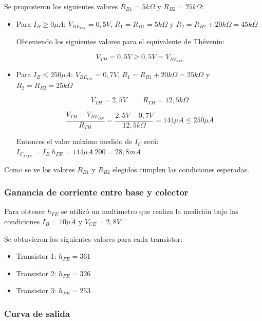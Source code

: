 \documentclass[10pt,spanish,a4paper,openany,notitlepage]{article}
\begin{document}
Se propusieron los siguientes valores $R_{B1} = 5\unit{k\Omega}$ y $R_{B2} = 25\unit{k\Omega}$:

\begin{itemize}
\item{Para $I_B \geq 0 \unit{\mu A}$}: $V_{BE_{ON}} = 0,5 \unit{V}$, $R_1 = R_{B1} = 5 \unit{k\Omega}$ y $R_2 = R_{B2} + 20\unit{k\Omega} = 45 \unit{k\Omega}$

Obteniendo los siguientes valores para el equivalente de Thévenin:

\[ \displaystyle V_{TH} =  0,5 \unit{V} \geq 0,5 \unit{V} = V_{BE_{ON}}\]

\item{Para $I_B \leq 250 \unit{\mu A}$}: $V_{BE_{ON}} = 0,7 \unit{V}$, $R_1 = R_{B1}+ 20\unit{k\Omega} = 25 \unit{k\Omega}$ y $R_2 = R_{B2} = 25 \unit{k\Omega}$

\[ \displaystyle V_{TH} =  2,5 \unit{V} \ \ \ \ \ \ \ \ \ \  R_{TH} = 12,5 \unit{k\Omega}\]

\[ \displaystyle \frac{V_{TH} - V_{BE_{ON}}}{R_{TH}} = \frac{2,5 \unit{V} - 0,7 \unit{V}}{12,5 \unit{k\Omega}} = 144 \unit{\mu A} \leq 250 \unit{\mu A} \]

Entonces el valor máximo medido de $I_C$ será: $I_{C_{MAX}} = I_B\ h_{FE} = 144 \unit{\mu A}\ 200 = 28,8 \unit{mA}$

\end{itemize}

Como se ve los valores $R_{B1}$ y $R_{B2}$ elegidos cumplen las condiciones esperadas.

\subsubsection{Ganancia de corriente entre base y colector}

Para obtener $h_{FE}$ se utilizó un multímetro que realiza la medición bajo las condiciones $I_B = 10 \unit{\mu A}$ y $V_{CE} = 2,8 \unit{V}$

Se obtuvieron los siguientes valores para cada transistor:

\begin{itemize}
\item{Transistor 1:} $h_{FE} = 361$
\item{Transistor 2:} $h_{FE} = 326$
\item{Transistor 3:} $h_{FE} = 253$
\end{itemize}

\subsubsection{Curva de salida}
\end{document}
